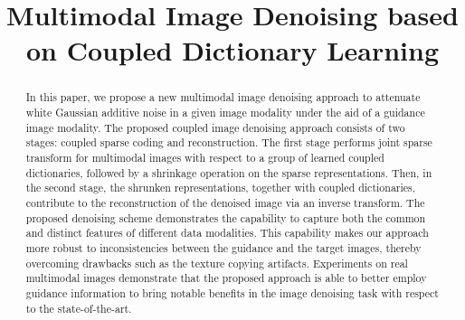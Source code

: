 \documentclass{article}
\title{Multimodal Image Denoising based on Coupled Dictionary Learning}
\begin{document}
\ninept
%
\maketitle
%

\begin{abstract}
	In this paper, we propose a new multimodal image denoising approach to attenuate white Gaussian additive noise in a given image modality under the aid of a guidance image modality. 
	The proposed coupled image denoising approach consists of two stages: coupled sparse coding and reconstruction. The first stage performs joint sparse transform for multimodal images with respect to a group of learned coupled dictionaries, followed by a shrinkage operation on the sparse representations. Then, in the second stage, the shrunken representations, together with coupled dictionaries, contribute to the reconstruction of the denoised image via an inverse transform.
	The proposed denoising scheme demonstrates the capability to capture both the common and distinct features of different data modalities. This capability makes our approach more robust to inconsistencies between the guidance and the target images,  thereby overcoming drawbacks such as the texture copying artifacts. Experiments on real multimodal images demonstrate that the proposed approach is able to better employ guidance information to bring notable benefits in the image denoising task with respect to the state-of-the-art.

	
	

\end{abstract}
	
\end{document}
